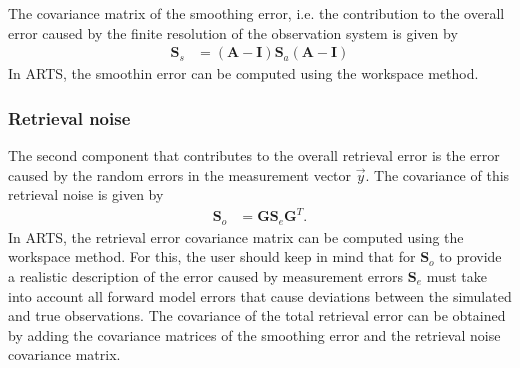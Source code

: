 The covariance matrix of the smoothing error, i.e. the contribution
 to the overall error caused by the finite resolution of the observation
 system is given by
%
\begin{eqnarray}
\mathbf{S}_s &= (\mathbf{A} - \mathbf{I})\mathbf{S}_a(\mathbf{A} -\mathbf{I})
\end{eqnarray}
%
In ARTS, the smoothin error can be computed using the 
workspace method.

\subsubsection{Retrieval noise}

The second component that contributes to the overall retrieval error is
the error caused by the random errors in the measurement vector $\vec{y}$.
  The covariance of this retrieval noise is given by
%
\begin{eqnarray}
\mathbf{S}_o &= \mathbf{G}\mathbf{S}_e\mathbf{G}^T.
\end{eqnarray}
%
In ARTS, the retrieval error covariance matrix can be computed using the
  workspace method. For this, the user should keep
in mind that for $\mathbf{S}_o$ to provide a realistic description of the
error caused by measurement errors $\mathbf{S}_e$ must take into account all
forward model errors that cause deviations between the simulated and true
observations.  The covariance of the total retrieval error can be obtained
 by adding the covariance matrices of the smoothing error and the retrieval
 noise covariance matrix.
